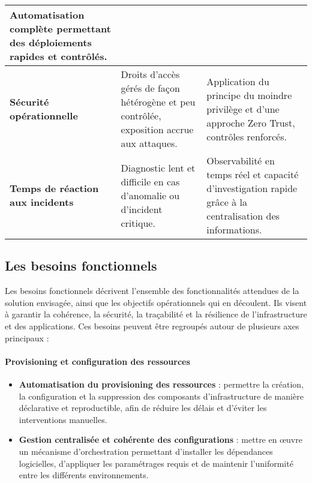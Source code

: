 \begin{longtable}{|p{5cm}|p{5cm}|p{5cm}|}
	Automatisation complète permettant des déploiements rapides et contrôlés.                                                                                                                           \\
	\hline
	\textbf{Sécurité opérationnelle}                                                                                             &
	Droits d’accès gérés de façon hétérogène et peu contrôlée, exposition accrue aux attaques.                                   &
	Application du principe du moindre privilège et d’une approche Zero Trust, contrôles renforcés.                                                                                                     \\
	\hline
	\textbf{Temps de réaction aux incidents}                                                                                     &
	Diagnostic lent et difficile en cas d’anomalie ou d’incident critique.                                                       &
	Observabilité en temps réel et capacité d’investigation rapide grâce à la centralisation des informations.                                                                                          \\
	\hline
\end{longtable}

\subsection{Les besoins fonctionnels}

Les besoins fonctionnels décrivent l'ensemble des fonctionnalités attendues de la solution envisagée, ainsi que les objectifs opérationnels qui en découlent. Ils visent à garantir la cohérence, la sécurité, la traçabilité et la résilience de l'infrastructure et des applications. Ces besoins peuvent être regroupés autour de plusieurs axes principaux :

\paragraph{\textbf{Provisioning et configuration des ressources}}

\begin{itemize}
	\item \textbf{Automatisation du provisioning des ressources} : permettre la création, la configuration et la suppression des composants d'infrastructure de manière déclarative et reproductible, afin de réduire les délais et d'éviter les interventions manuelles.
	\item \textbf{Gestion centralisée et cohérente des configurations} : mettre en œuvre un mécanisme d'orchestration permettant d'installer les dépendances logicielles, d'appliquer les paramétrages requis et de maintenir l'uniformité entre les différents environnements.
\end{itemize}

